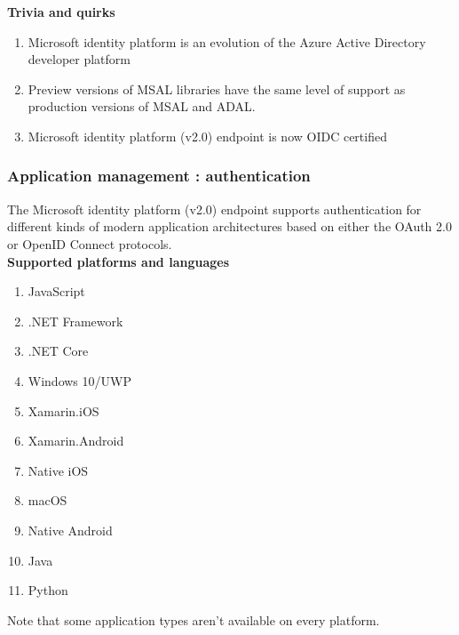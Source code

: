 \textbf{Trivia and quirks} 
\begin{enumerate}
\item Microsoft identity platform is an evolution of the Azure Active Directory developer platform
\item Preview versions of MSAL libraries have the same level of support as production versions of MSAL and ADAL.
\item Microsoft identity platform (v2.0) endpoint is now OIDC certified
\end{enumerate}

\subsubsection{Application management : authentication}
The Microsoft identity platform (v2.0) endpoint supports authentication for different kinds of modern application architectures based on either the OAuth 2.0 or OpenID Connect protocols. \\
\textbf{Supported platforms and languages} \\
\begin{enumerate}
\item JavaScript
\item .NET Framework
\item .NET Core
\item Windows 10/UWP
\item Xamarin.iOS
\item Xamarin.Android
\item Native iOS
\item macOS
\item Native Android
\item Java
\item Python
\end{enumerate}
Note that some application types aren't available on every platform. \\
